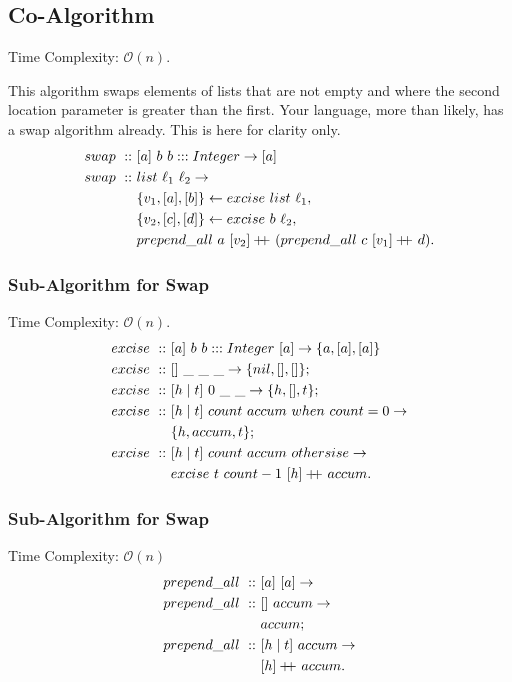 \documentclass[a4paper,10pt]{book}
\newcommand\doubleplus{+\kern-1.3ex+\kern0.8ex}
\begin{document}
\subsection{Co-Algorithm} Time Complexity: $\mathcal{O}(n)$.

This algorithm swaps elements of lists that are not empty and where the second location parameter is greater than the first. Your language, more than likely, has a swap algorithm already. This is here for clarity only.
\begin{align*}
swap\ ::\ &[a]\ b\ b:::Integer\rightarrow [a]\\
swap\ ::\ &list\ \ell_1\ \ell_2\rightarrow\\
	&\{v_1,[a],[b]\}\leftarrow excise\ list\ \ell_1,\\
	&\{v_2,[c],[d]\}\leftarrow excise\ b\ \ell_2,\\
	&prepend\_all\ a\ [v_2]\doubleplus (prepend\_all\ c\ [v_1]\doubleplus d).
\end{align*}
\subsubsection{Sub-Algorithm for Swap} Time Complexity: $\mathcal{O}(n).$
\begin{align*}
excise\ ::\ &[a]\ b\ b:::Integer\ [a]\rightarrow \{a,[a],[a]\}\\
excise\ ::\ &[]\ \_\ \_\ \_\rightarrow\{nil,[],[]\};\\
excise\ ::\ &[h\mid t]\ 0\ \_\ \_\rightarrow\{h,[],t\};\\
excise\ ::\ &[h\mid t]\ count\ accum\ when\ count=0\rightarrow\\
	&\{h,accum,t\};\\
excise\ ::\ &[h\mid t]\ count\ accum\ othersise\rightarrow\\
	&excise\ t\ count-1\ [h]\doubleplus accum.
\end{align*}
\subsubsection{Sub-Algorithm for Swap}
Time Complexity: $\mathcal{O}(n)$
\begin{align*}
prepend\_all\ ::\ &[a]\ [a]\rightarrow\\
prepend\_all\ ::\ &[]\ accum\rightarrow\\
	&accum;\\
prepend\_all\ ::\ &[h\mid t]\ accum\rightarrow\\
	&[h]\doubleplus accum.
\end{align*}
\end{document}
